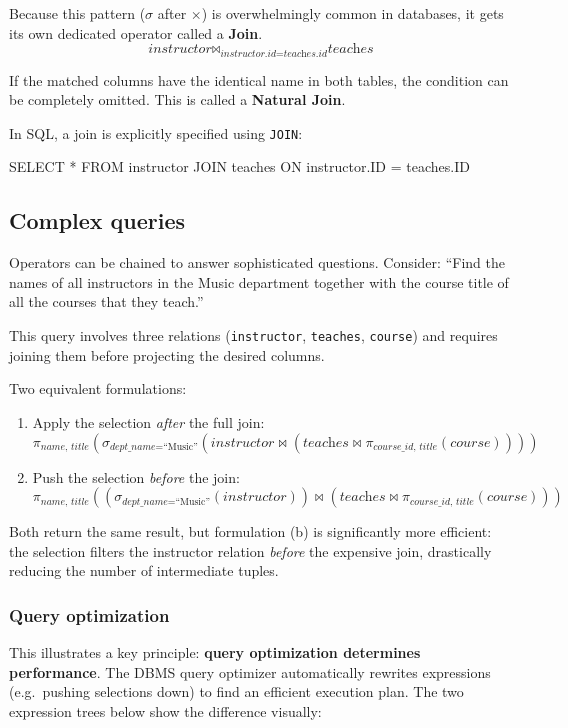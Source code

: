 \documentclass[../../dis.tex]{subfiles}
\begin{document}
Because this pattern ($\sigma$ after $\times$) is overwhelmingly common in databases, it gets its own dedicated operator called a \textbf{Join}.
\[ \textit{instructor} \bowtie_{\textit{instructor.id} = \textit{teaches.id}} \textit{teaches} \]

If the matched columns have the identical name in both tables, the condition can be completely omitted. This is called a \textbf{Natural Join}.

In SQL, a join is explicitly specified using \lstinline[style=SQLStyle]{JOIN}:
\begin{sql}
    SELECT * FROM instructor
    JOIN teaches ON instructor.ID = teaches.ID
\end{sql}

\subsection{Complex queries}
Operators can be chained to answer sophisticated questions. Consider: ``Find the names of all instructors in the Music department together with the course title of all the courses that they teach.''

This query involves three relations (\texttt{instructor}, \texttt{teaches}, \texttt{course}) and requires joining them before projecting the desired columns.

Two equivalent formulations:

\begin{enumerate}[label=(\alph*)]
    \item Apply the selection \emph{after} the full join:
    \[ \pi_{\textit{name, title}}\!\left(\sigma_{\textit{dept\_name} = \text{``Music''}}\!\left(\textit{instructor} \bowtie (\textit{teaches} \bowtie \pi_{\textit{course\_id, title}}(\textit{course}))\right)\right) \]
    \item Push the selection \emph{before} the join:
    \[ \pi_{\textit{name, title}}\!\left(\left(\sigma_{\textit{dept\_name} = \text{``Music''}}(\textit{instructor})\right) \bowtie \left(\textit{teaches} \bowtie \pi_{\textit{course\_id, title}}(\textit{course})\right)\right) \]
\end{enumerate}

Both return the same result, but formulation (b) is significantly more efficient: the selection filters the instructor relation \emph{before} the expensive join, drastically reducing the number of intermediate tuples.

\subsubsection*{Query optimization}
This illustrates a key principle: \textbf{query optimization determines performance}. The DBMS query optimizer automatically rewrites expressions (e.g.\ pushing selections down) to find an efficient execution plan. The two expression trees below show the difference visually:
\end{document}
